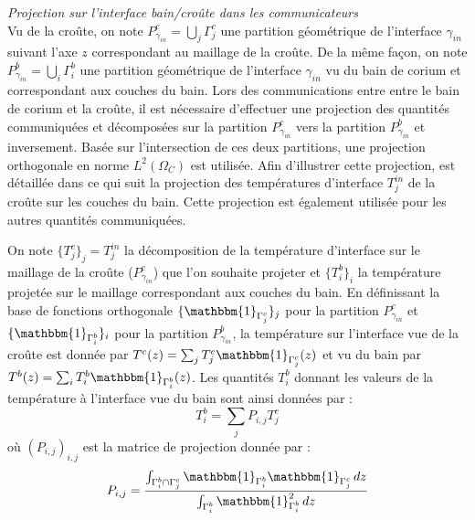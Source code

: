 {\it Projection sur l'interface bain/croûte dans les communicateurs}\\
Vu de la croûte, on note $P_{\gamma_{in}}^{c}=\displaystyle{\bigcup_j} \Gamma_j^c$ une partition géométrique de l'interface $\gamma_{in}$ suivant l'axe $z$ correspondant au maillage de la croûte. De la même façon, on note $P_{\gamma_{in}}^{b}=\displaystyle{\bigcup_i} \Gamma_i^b$ une partition géométrique de l'interface $\gamma_{in}$ vu du bain de corium et correspondant aux couches du bain. Lors des communications entre entre le bain de corium et la croûte, il est nécessaire d'effectuer une projection des quantités communiquées et décomposées sur la partition $P_{\gamma_{in}}^{c}$ vers la partition $P_{\gamma_{in}}^{b}$ et inversement. Basée sur l'intersection de ces deux partitions, une projection orthogonale en norme $L^2(\Omega_C)$ est utilisée. Afin d'illustrer cette projection, est détaillée dans ce qui suit la projection des températures d'interface $T_j^{in}$ de la croûte sur les couches du bain. Cette projection est également utilisée pour les autres quantités communiquées.

On note $\{T_j^c\}_j=T_j^{in}$ la décomposition de la température d'interface sur le maillage de la croûte ($P_{\gamma_{in}}^{c}$) que l'on souhaite projeter et $\{T_i^b\}_i$ la température projetée sur le maillage correspondant aux couches du bain.
En définissant la base de fonctions orthogonale $\{{\mathbbm{1}}_{\Gamma_j^c}\}_j$ pour la partition $P_{\gamma_{in}}^{c}$ et  $\{{\mathbbm{1}}_{\Gamma_i^b}\}_i$ pour la partition $P_{\gamma{_{in}}}^{b}$, la température sur l'interface vue de la croûte est donnée par $T^c(z)=\sum_j {T_j^c {\mathbbm{1}}_{\Gamma_j^c}(z)}$ et vu du bain par  $T^b(z)=\sum_i {T_i^b {\mathbbm{1}}_{\Gamma_i^b}(z)}$.
Les quantités $T_i^b$ donnant les valeurs de la température à l'interface vue du bain sont ainsi données par : $$T_i^b=\sum_j P_{i,j} T_j^c$$ où $\left(P_{i,j}\right)_{i,j}$ est la matrice de projection donnée par : $$P_{i,j}=\frac{\int_{\Gamma_i^b\cap\Gamma_j^c}{\mathbbm{1}}_{\Gamma_i^b}{\mathbbm{1}}_{\Gamma_j^c}\, dz}{ \int_{\Gamma_i^b}{\mathbbm{1}}_{\Gamma_i^b}^2\, dz}$$


